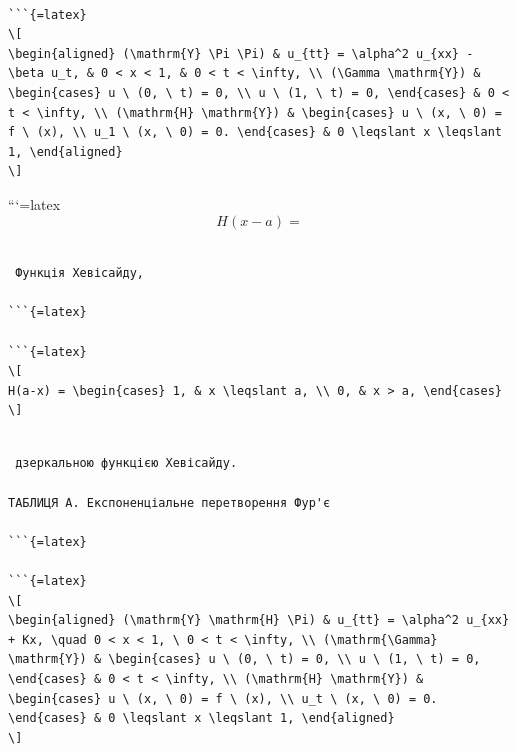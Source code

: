 \documentclass[
  ukrainian,
]{article}
\begin{document}
\begin{verbatim}

```{=latex}
\[
\begin{aligned} (\mathrm{Y} \Pi \Pi) & u_{tt} = \alpha^2 u_{xx} - \beta u_t, & 0 < x < 1, & 0 < t < \infty, \\ (\Gamma \mathrm{Y}) & \begin{cases} u \ (0, \ t) = 0, \\ u \ (1, \ t) = 0, \end{cases} & 0 < t < \infty, \\ (\mathrm{H} \mathrm{Y}) & \begin{cases} u \ (x, \ 0) = f \ (x), \\ u_1 \ (x, \ 0) = 0. \end{cases} & 0 \leqslant x \leqslant 1, \end{aligned}
\]
\end{verbatim}

```{=latex}
\[
H(x-a) =
\]

\begin{verbatim}

 Функція Хевісайду, 

```{=latex}

```{=latex}
\[
H(a-x) = \begin{cases} 1, & x \leqslant a, \\ 0, & x > a, \end{cases}
\]
\end{verbatim}

\begin{verbatim}

 дзеркальною функцією Хевісайду.

ТАБЛИЦЯ A. Експоненціальне перетворення Фур'є

```{=latex}

```{=latex}
\[
\begin{aligned} (\mathrm{Y} \mathrm{H} \Pi) & u_{tt} = \alpha^2 u_{xx} + Kx, \quad 0 < x < 1, \ 0 < t < \infty, \\ (\mathrm{\Gamma} \mathrm{Y}) & \begin{cases} u \ (0, \ t) = 0, \\ u \ (1, \ t) = 0, \end{cases} & 0 < t < \infty, \\ (\mathrm{H} \mathrm{Y}) & \begin{cases} u \ (x, \ 0) = f \ (x), \\ u_t \ (x, \ 0) = 0. \end{cases} & 0 \leqslant x \leqslant 1, \end{aligned}
\]
\end{verbatim}
\end{document}
